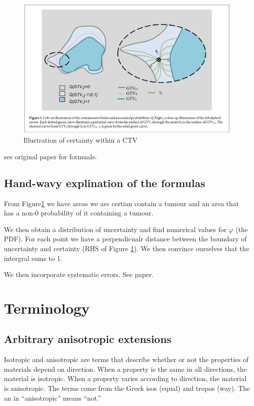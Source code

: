 \documentclass[11pt]{article}
\begin{document}
\begin{figure}[H]
    \centering
    \includegraphics[width=\textwidth]{images/PDF-of-CTV.png}
    \caption{Illustration of certainty within a CTV}
    \label{fig:pdf-of-ctv}
\end{figure}

see original paper for formuals.

\subsection{Hand-wavy explination of the formulas}

From Figure\ref{fig:pdf-of-ctv} we have areas we are certian contain a tumour and an area that has a non-0 probability of it containing a tumour. 

We then obtain a distribution of uncertainty and find numerical values for $\varphi$ (the PDF). For each point we have a perpendicualr distance between the boundary of uncertainty and certainty (RHS of Figure \ref{fig:pdf-of-ctv}). We then convince ourselves that the intergral sums to 1.

We then incorporate systematic errors. See paper.

\section{Terminology}

\subsection{Arbitrary anisotropic extensions} \label{term:arbitrary-anisotropic-extensions}

Isotropic and anisotropic are terms that describe whether or not the properties of materials depend on direction. When a property is the same in all directions, the material is isotropic. When a property varies according to direction, the material is anisotropic. The terms come from the Greek isos (equal) and tropos (way). The an in “anisotropic” means “not.” \cite{anisotropy}
\end{document}
